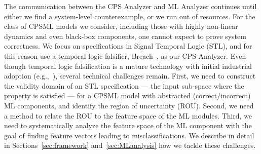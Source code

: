 The communication between the CPS Analyzer and ML Analyzer continues
until either we find a system-level counterexample, or we run out of
resources. For the class of CPSML models we consider, including those
with highly non-linear dynamics and even black-box components, one
cannot expect to prove system correctness.
We focus on specifications in Signal Temporal Logic (STL), and
for this reason use a temporal logic falsifier, Breach~\cite{donze2010breach}, 
as our CPS Analyzer.
Even though temporal logic falsification is a mature technology with
initial industrial adoption (e.g.,~\cite{yamaguchi-fmcad16}),
several technical challenges remain.
First, we need to construct the validity domain of an STL
specification --- the input sub-space where the property is 
satisfied --- for a CPSML model with abstracted (correct/incorrect) 
ML components, and identify the region of uncertainty (ROU).
Second, we need a method to relate the ROU 
to the feature space of the ML modules. 
Third, we need to systematically analyze the feature space of 
the ML component
with the goal of finding feature vectors leading to misclassifications.
We describe in detail in Sections~\ref{sec:framework} 
and~\ref{sec:MLanalysis} how we tackle these challenges.




